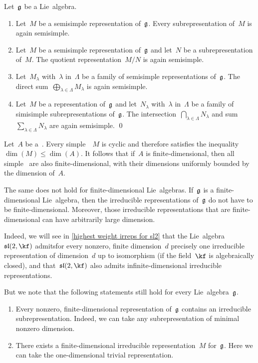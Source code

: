 \begin{corollary}
	Let~$\mathfrak{g}$ be a Lie~algebra.
	\begin{enumerate}
		\item
			Let~$M$ be a semisimple representation of~$\mathfrak{g}$.
			Every subrepresentation of~$M$ is again semisimple.
		\item
			Let~$M$ be a semisimple representation of~$\mathfrak{g}$ and let~$N$ be a subrepresentation of~$M$.
			The quotient representation~$M/N$ is again semisimple.
		\item
			Let~$M_\lambda$ with~$\lambda$ in~$\Lambda$ be a family of semisimple representations of~$\mathfrak{g}$.
			The direct sum~$\bigoplus_{\lambda \in \Lambda} M_\lambda$ is again semisimple.
		\item
			Let~$M$ be a representation of~$\mathfrak{g}$ and let~$N_\lambda$ with~$\lambda$ in~$\Lambda$ be a family of simisimple subrepresentations of~$\mathfrak{g}$.
			The intersection~$\bigcap_{\lambda \in \Lambda} N_\lambda$ and sum~$\sum_{\lambda \in \Lambda} N_\lambda$ are again semisimple.
		\qed
	\end{enumerate}
\end{corollary}


\begin{remark}
	Let~$A$ be a~{\algebra{$\kf$}}.
	Every simple~{}~$M$ is cyclic and therefore satisfies the inequality~$\dim(M) \leq \dim(A)$.
	It follows that if~$A$ is finite-dimensional, then all simple~{} are also finite-dimensional, with their dimensions uniformly bounded by the dimension of~$A$.
	
	The same does not hold for finite-dimensional Lie~algebras.
	If~$\mathfrak{g}$ is a finite-dimensional Lie~algebra, then the irreducible representations of~$\mathfrak{g}$ do not have to be finite-dimensional.
	Moreover, those irreducible representations that are finite-dimensional can have arbitrarily large dimension.
	
	Indeed, we will see in \cref{highest weight irreps for sl2} that the Lie~algebra~$\sllie(2,\kf)$ admitsfor every nonzero, finite dimension~$d$ precisely one irreducible representation of dimension~$d$ up to isomorphism (if the field~$\kf$ is algebraically closed), and that~$\sllie(2,\kf)$ also admits infinite-dimensional irreducible representations.
	
	But we note that the following statements still hold for every Lie~algebra~$\mathfrak{g}$.
	\begin{enumerate}
		\item
			Every nonzero, finite-dimensional representation of~$\mathfrak{g}$ contains an irreducible subrepresentation.
			Indeed, we can take any subrepresentation of minimal nonzero dimension.
		\item
			There exists a finite-dimensional irreducible representation~$M$ for~$\mathfrak{g}$.
			Here we can take the one-dimensional trivial representation.
	\end{enumerate}
\end{remark}


